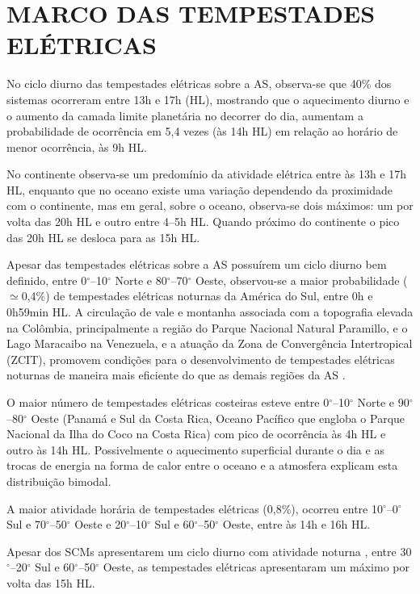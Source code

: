 \section{MARCO DAS TEMPESTADES ELÉTRICAS}

No ciclo diurno das tempestades elétricas sobre a AS, observa-se que 40\% dos sistemas ocorreram entre 13h e 17h (HL), mostrando que o aquecimento diurno e o aumento da camada limite planetária no decorrer do dia, aumentam a probabilidade de ocorrência em 5,4 vezes (às 14h HL) em relação ao horário de menor ocorrência, às 9h HL.

No continente observa-se um predomínio da atividade elétrica entre às 13h e 17h HL, enquanto que no oceano existe uma variação dependendo da proximidade com o continente, mas em geral, sobre o oceano, observa-se dois máximos: um por volta das 20h HL e outro entre 4--5h HL. Quando próximo do continente o pico das 20h HL se desloca para as 15h HL.  

Apesar das tempestades elétricas sobre a AS possuírem um ciclo diurno bem definido, entre 0$^{\circ}$--10$^{\circ}$ Norte e 80$^{\circ}$--70$^{\circ}$ Oeste, observou-se a maior probabilidade ($\simeq$0,4\%) de tempestades elétricas noturnas da América do Sul, entre 0h e 0h59min HL. A circulação de vale e montanha associada com a topografia elevada na Colômbia, principalmente a região do Parque Nacional Natural Paramillo, e o Lago Maracaibo na Venezuela, e a atuação da Zona de Convergência Intertropical (ZCIT), promovem condições para o desenvolvimento de tempestades elétricas noturnas de maneira mais eficiente do que as demais regiões da AS \cite{albrecht2011b,burgesser2012}.

O maior número de tempestades elétricas costeiras esteve entre 0$^{\circ}$--10$^{\circ}$ Norte e 90$^{\circ}$--80$^{\circ}$ Oeste (Panamá e Sul da Costa Rica,  Oceano Pacífico que engloba o Parque Nacional da Ilha do Coco na Costa Rica) com pico de ocorrência às 4h HL e outro às 14h HL. Possivelmente o aquecimento superficial durante o dia e as trocas de energia na forma de calor entre o oceano e a atmosfera explicam esta distribuição bimodal.

A maior atividade horária de tempestades elétricas (0,8\%), ocorreu entre 10$^{\circ}$--0$^{\circ}$ Sul e 70$^{\circ}$--50$^{\circ}$ Oeste e 20$^{\circ}$--10$^{\circ}$ Sul e 60$^{\circ}$--50$^{\circ}$ Oeste, entre às 14h e 16h HL.

Apesar dos SCMs apresentarem um ciclo diurno com atividade noturna \cite{Velasco1987, Durkee2009, machado1998}, entre 30$^{\circ}$--20$^{\circ}$ Sul e 60$^{\circ}$--50$^{\circ}$ Oeste, as tempestades elétricas apresentaram um máximo por volta das 15h HL.


